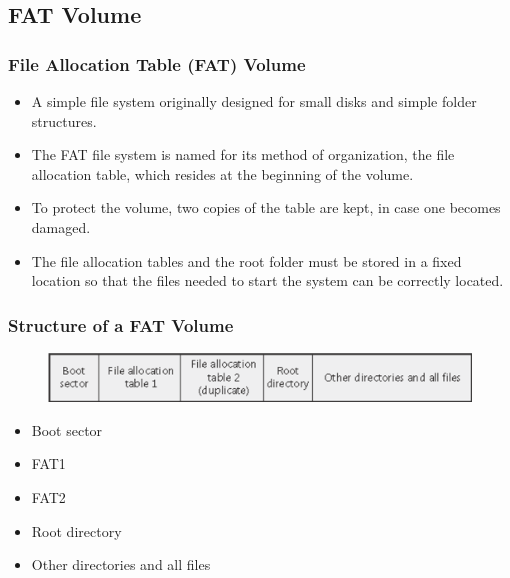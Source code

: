 \subsection{FAT Volume} %
\begin{frame}[fragile]
    \frametitle{File Allocation Table (FAT) Volume}
\begin{itemize}
    \item A simple file system originally {\color{red}designed for small disks and simple folder structures}.  \pause
    \item The FAT file system is named for its method of organization, the {\color{red}file allocation table}, which resides at the beginning of the volume.
    \item To protect the volume, two copies of the table are kept, in case one becomes damaged. \pause
    \item {\color{red}The file allocation tables and the root folder must be stored in a fixed location} so that the files needed to start the system can be correctly located.
\end{itemize}
\end{frame}
% 
% 
% 
% 
\begin{frame}[fragile]
    \frametitle{Structure of a FAT Volume}
        \begin{figure}
        \includegraphics[width=1.0\linewidth]{figs/FAT-volume.png}
        \end{figure}
    \begin{itemize}
        \item Boot sector \pause
        \item FAT1
        \item FAT2
        \item Root directory \pause
        \item Other directories and all files
    \end{itemize}
\end{frame}
